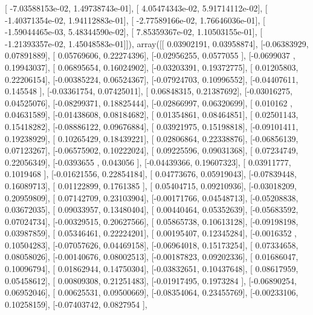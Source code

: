 \documentclass{article}
\begin{document}
       [ -7.03588153e-02,   1.49738743e-01],
       [  4.05474343e-02,   5.91714112e-02],
       [ -1.40371354e-02,   1.94112883e-01],
       [ -2.77589166e-02,   1.76646036e-01],
       [ -1.59044465e-03,   5.48344590e-02],
       [  7.85359367e-02,   1.10503155e-01],
       [ -1.21393357e-02,   1.45048583e-01]]), array([[ 0.03902191,  0.03958874],
       [-0.06383929,  0.07891889],
       [ 0.05769606,  0.22274396],
       [-0.02956255,  0.0577055 ],
       [-0.0699037 ,  0.19943037],
       [ 0.06895654,  0.16024902],
       [-0.03203391,  0.19372775],
       [ 0.01205803,  0.22206154],
       [-0.00385224,  0.06524367],
       [-0.07924703,  0.10996552],
       [-0.04407611,  0.145548  ],
       [-0.03361754,  0.07425011],
       [ 0.06848315,  0.21387692],
       [-0.03016275,  0.04525076],
       [-0.08299371,  0.18825444],
       [-0.02866997,  0.06320699],
       [ 0.010162  ,  0.04631589],
       [-0.01438608,  0.08184682],
       [ 0.01354861,  0.08464851],
       [ 0.02501143,  0.15418282],
       [-0.08886122,  0.09676884],
       [ 0.03921975,  0.15198818],
       [-0.09101411,  0.19238929],
       [ 0.10265429,  0.18439221],
       [ 0.02806864,  0.22338876],
       [-0.06856139,  0.07123267],
       [-0.06575902,  0.10222024],
       [ 0.09225596,  0.09031368],
       [ 0.07234749,  0.22056349],
       [-0.0393655 ,  0.043056  ],
       [-0.04439366,  0.19607323],
       [ 0.03911777,  0.1019468 ],
       [-0.01621556,  0.22854184],
       [ 0.04773676,  0.05919043],
       [-0.07839448,  0.16089713],
       [ 0.01122899,  0.1761385 ],
       [ 0.05404715,  0.09210936],
       [-0.03018209,  0.20959809],
       [ 0.07142709,  0.23103904],
       [-0.00171766,  0.04548713],
       [-0.05208838,  0.03672035],
       [ 0.09033957,  0.13480404],
       [ 0.00440464,  0.05352639],
       [-0.05683592,  0.07024734],
       [-0.00329515,  0.20627566],
       [ 0.05865738,  0.10613128],
       [-0.09198198,  0.03987859],
       [ 0.05346461,  0.22224201],
       [ 0.00195407,  0.12345284],
       [-0.0016352 ,  0.10504283],
       [-0.07057626,  0.04469158],
       [-0.06964018,  0.15173254],
       [ 0.07334658,  0.08058026],
       [-0.00140676,  0.08002513],
       [-0.00187823,  0.09202336],
       [ 0.01686047,  0.10096794],
       [ 0.01862944,  0.14750304],
       [-0.03832651,  0.10437648],
       [ 0.08617959,  0.05458612],
       [ 0.00809308,  0.21251483],
       [-0.01917495,  0.1973284 ],
       [-0.06890254,  0.06952046],
       [ 0.00625531,  0.09500669],
       [-0.08354064,  0.23455769],
       [-0.00233106,  0.10258159],
       [-0.07403742,  0.0827954 ],
\end{document}
